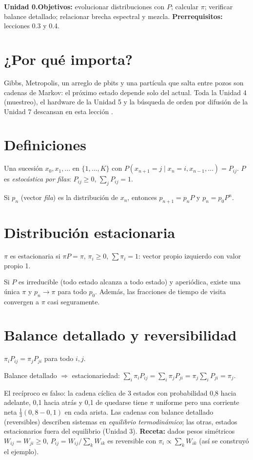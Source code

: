 \documentclass[11pt,a4paper]{article}
\begin{document}

\noindent\textbf{Unidad 0.}\quad\textbf{Objetivos:} evolucionar distribuciones con $P$; calcular $\pi$; verificar
balance detallado; relacionar brecha espectral y mezcla. \textbf{Prerrequisitos:} lecciones 0.3 y 0.4.

\section{¿Por qué importa?}
Gibbs, Metropolis, un arreglo de pbits y una partícula que salta entre pozos son cadenas de Markov: el próximo
estado depende solo del actual. Toda la Unidad 4 (muestreo), el hardware de la Unidad 5 y la búsqueda de orden
por difusión de la Unidad 7 descansan en esta lección \cite{levin}.

\section{Definiciones}
\begin{definicion}
Una sucesión $x_0,x_1,\dots$ en $\{1,\dots,K\}$ con $P(x_{n+1}=j\mid x_n=i,x_{n-1},\dots)=P_{ij}$. $P$ es
\emph{estocástica por filas}: $P_{ij}\ge0$, $\sum_jP_{ij}=1$.
\end{definicion}
Si $p_n$ (vector \emph{fila}) es la distribución de $x_n$, entonces $p_{n+1}=p_nP$ y $p_n=p_0P^n$.

\section{Distribución estacionaria}
$\pi$ es estacionaria si $\pi P=\pi$, $\pi_i\ge0$, $\sum\pi_i=1$: vector propio izquierdo con valor propio 1.
\begin{teorema}
Si $P$ es irreducible (todo estado alcanza a todo estado) y aperiódica, existe una única $\pi$ y
$p_n\to\pi$ para todo $p_0$. Además, las fracciones de tiempo de visita convergen a $\pi$ casi seguramente.
\end{teorema}

\section{Balance detallado y reversibilidad}
\begin{definicion}
$\pi_iP_{ij}=\pi_jP_{ji}$ para todo $i,j$.
\end{definicion}
\begin{proposicion}
Balance detallado $\Rightarrow$ estacionariedad: $\sum_i\pi_iP_{ij}=\sum_i\pi_jP_{ji}=\pi_j\sum_iP_{ji}=\pi_j$.
\end{proposicion}
El recíproco es falso: la cadena cíclica de 3 estados con probabilidad 0,8 hacia adelante, 0,1 hacia atrás y 0,1
de quedarse tiene $\pi$ uniforme pero una corriente neta $\frac13(0{,}8-0{,}1)$ en cada arista. Las cadenas con
balance detallado (reversibles) describen sistemas en \emph{equilibrio termodinámico}; las otras, estados
estacionarios fuera del equilibrio (Unidad 3). \textbf{Receta:} dados pesos simétricos $W_{ij}=W_{ji}\ge0$,
$P_{ij}=W_{ij}/\sum_kW_{ik}$ es reversible con $\pi_i\propto\sum_kW_{ik}$ (así se construyó el ejemplo).
\end{document}
